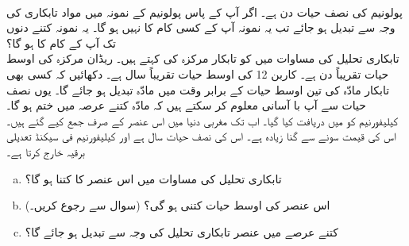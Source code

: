 \\
پولونیم   کی نصف حیات   دن ہے۔ اگر آپ کے پاس پولونیم  کے نمونہ میں  مواد تابکاری کی وجہ سے تبدیل ہو جائے تب یہ نمونہ آپ کے کسی کام کا نہیں ہو گا۔ یہ نمونہ کتنے دنوں تک آپ کے کام کا ہو گا؟
\\
تابکاری تحلیل کی مساوات  میں   کو تابکار مرکزہ کی  کہتے ہیں۔ ریڈان مرکزہ کی اوسط حیات تقریباً  دن ہے۔ کاربن 12 کی اوسط حیات تقریباً  سال ہے۔ دکھائیں کہ کسی بھی تابکار مادّہ کی تین اوسط حیات کے برابر وقت میں  مادّہ تبدیل ہو جائے گا۔ یوں نصف حیات سے آپ با آسانی معلوم کر سکتے ہیں کہ مادّہ کتنے عرصہ میں  ختم ہو گا۔
\\
کیلیفورنیم     کو  میں  دریافت کیا گیا۔ اب تک مغربی دنیا میں اس عنصر کے صرف  جمع کیے گئے ہیں۔ اس کی قیمت سونے سے  گنا زیادہ ہے۔ اس کی نصف حیات  سال ہے اور   کیلیفورنیم فی سیکنڈ  تعدیلی برقیہ خارج کرتا ہے۔
\begin{enumerate}[a.]
\item
تابکاری تحلیل کی مساوات میں اس عنصر کا  کتنا ہو گا؟
\item
اس عنصر کی اوسط حیات کتنی ہو گی؟ (سوال  سے رجوع کریں۔)
\item
کتنے عرصے  میں  عنصر تابکاری تحلیل کی وجہ سے تبدیل ہو جائے گا؟
\end{enumerate}

